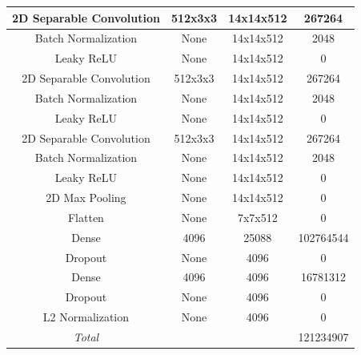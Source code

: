 \documentclass[runningheads]{llncs}
\begin{document}
\begin{table}[]
{\begin{tabular}{|c|c|c|c|}
2D Separable Convolution & 512x3x3        & 14x14x512            & 267264                     \\ \hline
Batch Normalization      & None           & 14x14x512            & 2048                       \\ \hline
Leaky ReLU               & None           & 14x14x512            & 0                          \\ \hline
2D Separable Convolution & 512x3x3        & 14x14x512            & 267264                     \\ \hline
Batch Normalization      & None           & 14x14x512            & 2048                       \\ \hline
Leaky ReLU               & None           & 14x14x512            & 0                          \\ \hline
2D Separable Convolution & 512x3x3        & 14x14x512            & 267264                     \\ \hline
Batch Normalization      & None           & 14x14x512            & 2048                       \\ \hline
Leaky ReLU               & None           & 14x14x512            & 0                          \\ \hline
2D Max Pooling           & None           & 14x14x512            & 0                          \\ \hline
Flatten                  & None           & 7x7x512              & 0                          \\ \hline
Dense                    & 4096           & 25088                & 102764544                  \\ \hline
Dropout                  & None           & 4096                 & 0                          \\ \hline
Dense                    & 4096           & 4096                 & 16781312                   \\ \hline
Dropout                  & None           & 4096                 & 0                          \\ \hline
L2 Normalization         & None           & 4096                 & 0                          \\ \hline
\rowcolor[HTML]{9B9B9B} 
\textit{Total}           &                &                      & 121234907                  \\ \hline
\end{tabular}%
}
\end{table}
\end{document}
